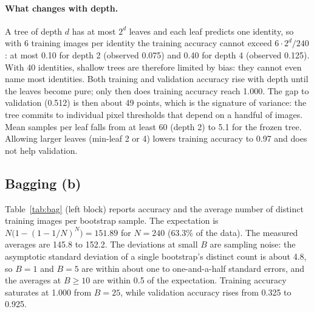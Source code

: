 \documentclass[10pt,twocolumn,letterpaper]{article}
\begin{document}
\paragraph{What changes with depth.}
A tree of depth $d$ has at most $2^d$ leaves and each leaf predicts one identity, so with 6 training images per identity the training accuracy cannot exceed $6\cdot 2^d/240$: at most 0.10 for depth 2 (observed 0.075) and 0.40 for depth 4 (observed 0.125). With 40 identities, shallow trees are therefore limited by bias: they cannot even name most identities. Both training and validation accuracy rise with depth until the leaves become pure; only then does training accuracy reach 1.000. The gap to validation (0.512) is then about 49 points, which is the signature of variance: the tree commits to individual pixel thresholds that depend on a handful of images. Mean samples per leaf falls from at least 60 (depth 2) to 5.1 for the frozen tree. Allowing larger leaves (min-leaf 2 or 4) lowers training accuracy to 0.97 and does not help validation.

\subsection{Bagging (b)}
Table~\ref{tab:bag} (left block) reports accuracy and the average number of distinct training images per bootstrap sample. The expectation is $N\bigl(1-(1-1/N)^N\bigr)=151.89$ for $N{=}240$ (63.3\% of the data). The measured averages are 145.8 to 152.2. The deviations at small $B$ are sampling noise: the asymptotic standard deviation of a single bootstrap's distinct count is about 4.8, so $B{=}1$ and $B{=}5$ are within about one to one-and-a-half standard errors, and the averages at $B\ge 10$ are within 0.5 of the expectation. Training accuracy saturates at 1.000 from $B{=}25$, while validation accuracy rises from 0.325 to 0.925.
\end{document}
